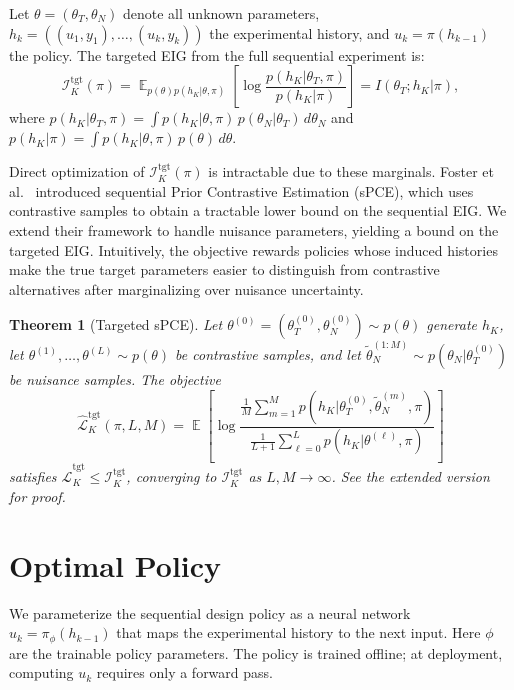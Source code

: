 \documentclass[conference]{IEEEtran}
\newif\ifextended
\newtheorem{theorem}{Theorem}
\DeclareMathOperator{\E}{\mathbb{E}}
\begin{document}
Let $\theta = (\theta_T, \theta_N)$ denote all unknown parameters, $h_k = ((u_1, y_1), \ldots, (u_k, y_k))$ the experimental history, and $u_k = \pi(h_{k-1})$ the policy.
The targeted EIG from the full sequential experiment is:
\begin{equation}
\mathcal{I}_K^{\text{tgt}}(\pi) = \E_{p(\theta)p(h_K|\theta,\pi)}\left[\log \frac{p(h_K|\theta_T,\pi)}{p(h_K|\pi)}\right] = I(\theta_T; h_K | \pi),
\end{equation}
where $p(h_K|\theta_T, \pi) = \int p(h_K|\theta, \pi)\, p(\theta_N|\theta_T) \, d\theta_N$ and $p(h_K|\pi) = \int p(h_K|\theta,\pi)\,p(\theta)\,d\theta$.

Direct optimization of $\mathcal{I}_K^{\text{tgt}}(\pi)$ is intractable due to these marginals. Foster et al.~\cite{foster2021} introduced sequential Prior Contrastive Estimation (sPCE), which uses contrastive samples to obtain a tractable lower bound on the sequential EIG. We extend their framework to handle nuisance parameters, yielding a bound on the targeted EIG. Intuitively, the objective rewards policies whose induced histories make the true target parameters easier to distinguish from contrastive alternatives after marginalizing over nuisance uncertainty.

\begin{theorem}[Targeted sPCE]
\label{thm:targeted_spce_main}
Let $\theta^{(0)} = (\theta_T^{(0)}, \theta_N^{(0)}) \sim p(\theta)$ generate $h_K$, let $\theta^{(1)},\ldots,\theta^{(L)} \sim p(\theta)$ be contrastive samples, and let $\tilde{\theta}_N^{(1:M)} \sim p(\theta_N|\theta_T^{(0)})$ be nuisance samples. The objective
\begin{equation}
\hat{\mathcal{L}}_K^{\text{tgt}}(\pi, L, M) = \E\left[\log \frac{\frac{1}{M}\sum_{m=1}^{M} p(h_K|\theta_T^{(0)}, \tilde{\theta}_N^{(m)}, \pi)}{\frac{1}{L+1}\sum_{\ell=0}^{L} p(h_K|\theta^{(\ell)}, \pi)}\right]
\end{equation}
satisfies $\hat{\mathcal{L}}_K^{\text{tgt}} \leq \mathcal{I}_K^{\text{tgt}}$, converging to $\mathcal{I}_K^{\text{tgt}}$ as $L, M \to \infty$.
\ifextended See Appendix~\ref{sec:nuisance} for proof.\else{} See the extended version~\cite{strouwen2026extended} for proof.\fi
\end{theorem}

\section{Optimal Policy}
We parameterize the sequential design policy as a neural network $u_k = \pi_\phi(h_{k-1})$ that maps the experimental history to the next input.
Here $\phi$ are the trainable policy parameters.
The policy is trained offline; at deployment, computing $u_k$ requires only a forward pass.
\end{document}
